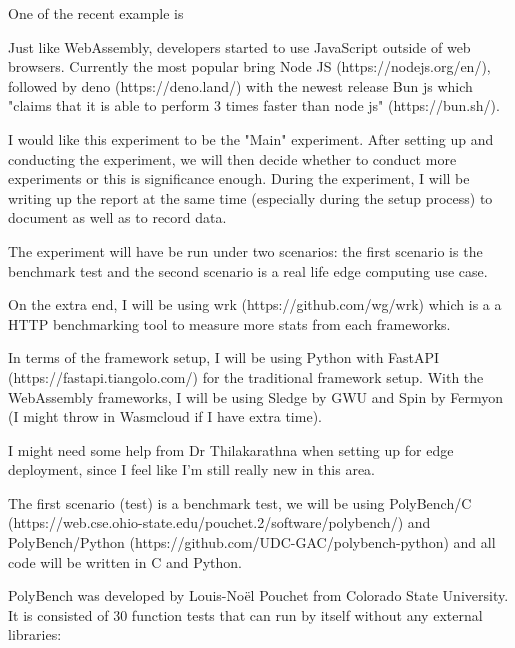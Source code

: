 \bigskip
\bigskip

One of the recent example is 

\bigskip
\bigskip
\bigskip
\bigskip
\bigskip
\bigskip

Just like WebAssembly, developers started to use JavaScript outside of web browsers. Currently the most popular bring Node JS (https://nodejs.org/en/), followed by deno (https://deno.land/) with the newest release Bun js which "claims that it is able to perform 3 times faster than node js" (https://bun.sh/).

I would like this experiment to be the "Main" experiment. After setting up and conducting the experiment, we will then decide whether to conduct more experiments or this is significance enough. During the experiment, I will be writing up the report at the same time (especially during the setup process) to document as well as to record data.

The experiment will have be run under two scenarios: the first scenario is the benchmark test and the second scenario is a real life edge computing use case.

On the extra end, I will be using wrk (https://github.com/wg/wrk) which is a a HTTP benchmarking tool to measure more stats from each frameworks.

In terms of the framework setup, I will be using Python with FastAPI (https://fastapi.tiangolo.com/) for the traditional framework setup. With the WebAssembly frameworks, I will be using Sledge by GWU and Spin by Fermyon (I might throw in Wasmcloud if I have extra time).

I might need some help from Dr Thilakarathna when setting up for edge deployment, since I feel like I'm still really new in this area.

The first scenario (test) is a benchmark test, we will be using PolyBench/C (https://web.cse.ohio-state.edu\newline/pouchet.2/software/polybench/) and PolyBench/Python (https://github.com/UDC-GAC/polybench-python) and all code will be written in C and Python.

PolyBench was developed by Louis-Noël Pouchet from Colorado State University. It is consisted of 30 function tests that can run by itself without any external libraries:

